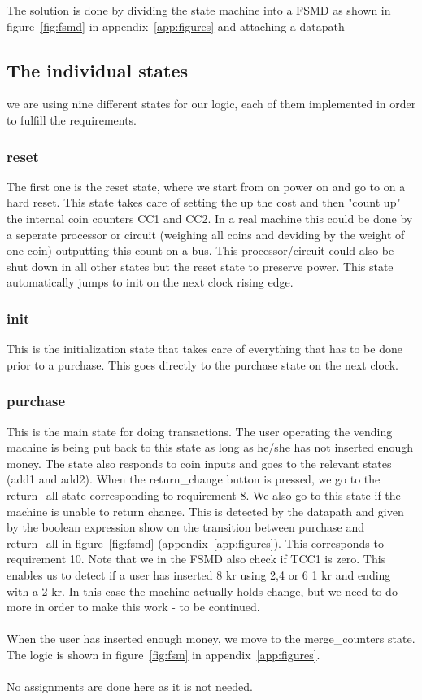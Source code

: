The solution is done by dividing the state machine into a FSMD as shown in figure~\ref{fig:fsmd} in appendix~\ref{app:figures} and attaching a datapath

\subsection{The individual states}
we are using nine different states for our logic, each of them implemented in order to fulfill the requirements.
\subsubsection{reset}
The first one is the reset state, where we start from on power on and go to on a hard reset. This state takes care of setting the up the cost and
then "count up" the internal coin counters CC1 and CC2. In a real machine this could be done by a seperate processor or circuit (weighing all coins
and deviding by the weight of one coin) outputting this count on a bus. This processor/circuit could also be shut down in all other states but the 
reset state to preserve power. This state automatically jumps to init on the next clock rising edge.

\subsubsection{init}
This is the initialization state that takes care of everything that has to be done prior to a purchase. This goes directly to the purchase state on the next clock.

\subsubsection{purchase}
This is the main state for doing transactions. The user operating the vending machine is being put back to this state as long as he/she has not inserted enough
money. The state also responds to coin inputs and goes to the relevant states (add1 and add2). When the return\_change button is pressed, we go
to the return\_all state corresponding to requirement 8. We also go to this state if the machine is unable to return change. This is detected by
the datapath and given by the boolean expression show on the transition between purchase and return\_all in figure~\ref{fig:fsmd} (appendix~\ref{app:figures}). This corresponds to requirement 10. Note that we in the FSMD also check if TCC1 is zero. This enables us to detect if 
a user has inserted 8 kr using 2,4 or 6 1 kr and ending with a 2 kr. In this case the machine actually holds change, but we need to do more in order
to make this work - to be continued.\\
\\
When the user has inserted enough money, we move to the merge\_counters state. The logic is shown in figure~\ref{fig:fsm} in appendix~\ref{app:figures}.\\
\\
No assignments are done here as it is not needed.

